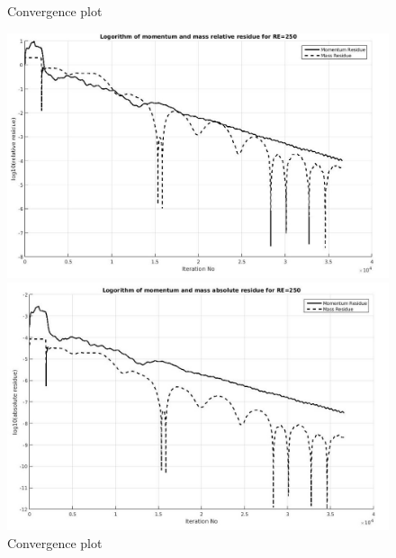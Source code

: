 \documentclass[12pt]{elsarticle}
\begin{document}
	\begin{figure}[h]
		\caption{Convergence plot}
		\centering\includegraphics[width=1.0\linewidth]{53_grid3_rr_re_250}
		\caption{Convergence plot}
		\centering\includegraphics[width=1.0\linewidth]{54_grid3_ar_re_250}
	\end{figure}
	
\end{document}
